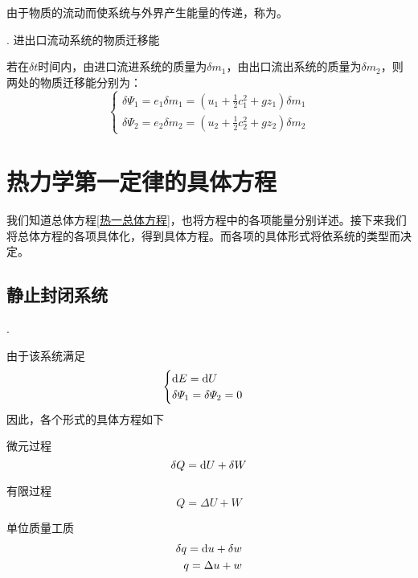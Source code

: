 由于物质的流动而使系统与外界产生能量的传递，称为。\rgap

. 进出口流动系统的物质迁移能
\par 若在$\delta t$时间内，由进口流进系统的质量为$\delta m_1$，由出口流出系统的质量为$\delta m_2$，则两处的物质迁移能分别为：
\begin{equation}
	\begin{cases}
		\displaystyle \delta \varPsi_1 = e_1 \delta m_1 = \left(u_1 + \frac 1 2 c_1^2 +g z_1\right)\delta m_1\\[1em]
			\displaystyle \delta \varPsi_2 = e_2 \delta m_2 = \left(u_2 + \frac 1 2 c_2^2 +g z_2\right)\delta m_2
	\end{cases}
\end{equation}

\section{热力学第一定律的具体方程}
我们知道总体方程\eqref{热一总体方程}，也将方程中的各项能量分别详述。接下来我们将总体方程的各项具体化，得到具体方程。而各项的具体形式将依系统的类型而决定。\rgap

\subsection{静止封闭系统}

. \dya[一般情况]\rgap
\par 由于该系统满足
\begin{equation}
	\begin{cases}
		\displaystyle {\rm{d}} E ={\rm{d}} U\\
		\displaystyle \delta \varPsi_1 = \delta \varPsi_2=0
	\end{cases}
\end{equation}
因此，各个形式的具体方程如下
\begin{myitemize}
		\item 微元过程
	\begin{equation}
		\delta Q ={\rm{d}} U + \delta W
	\end{equation}
	\item 有限过程
	\begin{equation}
		Q = \Delta U +W
	\end{equation}
	\item 单位质量工质
	\begin{equation}
		\begin{split}
			\displaystyle \delta q = {\rm{d}} u + \delta w\\
			\displaystyle q = \Delta u + w
		\end{split}
	\end{equation}
\end{myitemize}
\vspace*{1em}

